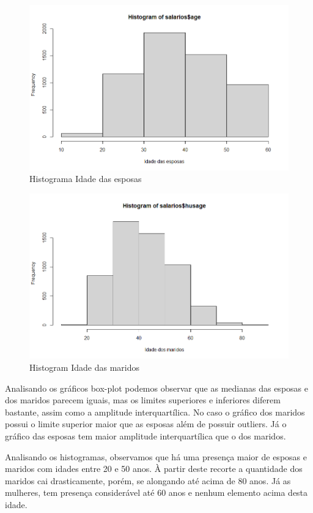\begin{figure}[H]
\centering
\includegraphics[width=1\linewidth]{apendices/fig/4_IAA004_3.png}
\caption{Histograma Idade das esposas}
\end{figure}
\begin{figure}[H]
\centering
\includegraphics[width=1\linewidth]{apendices/fig/4_IAA004_4.png}
\caption{Histogram Idade das maridos}
\end{figure}

Analisando os gráficos box-plot podemos observar que as medianas das esposas e dos maridos parecem iguais, mas os limites superiores e inferiores diferem bastante, assim como a amplitude interquartílica. No caso o gráfico dos maridos possui o limite superior maior que as esposas além de possuir outliers. Já o gráfico das esposas tem maior amplitude interquartílica que o dos maridos.

Analisando os histogramas, observamos que há uma presença maior de esposas e maridos com idades entre 20 e 50 anos. À partir deste recorte a quantidade dos maridos cai drasticamente, porém, se alongando até acima de 80 anos. Já as mulheres, tem presença considerável até 60 anos e nenhum elemento acima desta idade. 

